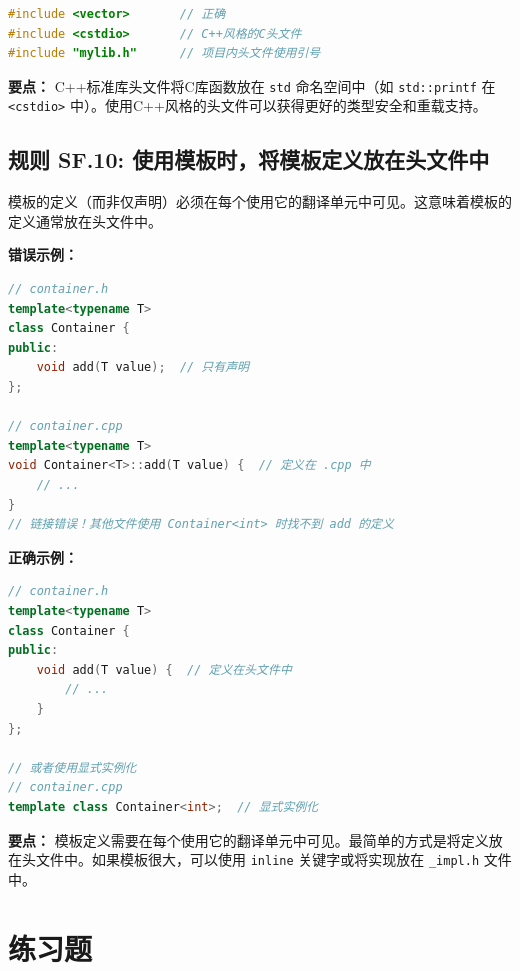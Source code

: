 \begin{lstlisting}[language=C++]
#include <vector>       // 正确
#include <cstdio>       // C++风格的C头文件
#include "mylib.h"      // 项目内头文件使用引号
\end{lstlisting}

\textbf{要点：} C++标准库头文件将C库函数放在 \texttt{std} 命名空间中（如 \texttt{std::printf} 在 \texttt{<cstdio>} 中）。使用C++风格的头文件可以获得更好的类型安全和重载支持。

\subsection*{\textbf{规则 SF.10:} 使用模板时，将模板定义放在头文件中}

模板的定义（而非仅声明）必须在每个使用它的翻译单元中可见。这意味着模板的定义通常放在头文件中。

\textbf{错误示例：}

\begin{lstlisting}[language=C++]
// container.h
template<typename T>
class Container {
public:
    void add(T value);  // 只有声明
};

// container.cpp
template<typename T>
void Container<T>::add(T value) {  // 定义在 .cpp 中
    // ...
}
// 链接错误！其他文件使用 Container<int> 时找不到 add 的定义
\end{lstlisting}

\textbf{正确示例：}

\begin{lstlisting}[language=C++]
// container.h
template<typename T>
class Container {
public:
    void add(T value) {  // 定义在头文件中
        // ...
    }
};

// 或者使用显式实例化
// container.cpp
template class Container<int>;  // 显式实例化
\end{lstlisting}

\textbf{要点：} 模板定义需要在每个使用它的翻译单元中可见。最简单的方式是将定义放在头文件中。如果模板很大，可以使用 \texttt{inline} 关键字或将实现放在 \texttt{\_impl.h} 文件中。

\section*{练习题}

